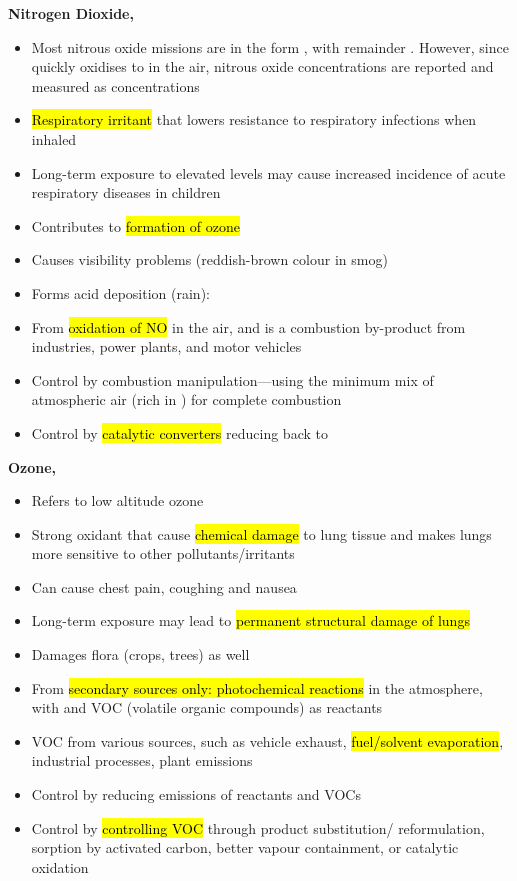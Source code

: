 \documentclass{article}
\newcommand{\headingsmall}[1]{{\small\textbf{#1}}}
\begin{document}
\begin{multicols*}{4}
\headingsmall{Nitrogen Dioxide, }
\begin{itemize} \itemsep -0.5em
    \item Most nitrous oxide missions are in the form , with remainder
        . However, since  quickly oxidises to  in
        the air, nitrous oxide concentrations are reported and measured as
         concentrations
    \item \hl{Respiratory irritant} that lowers resistance to respiratory
        infections when inhaled
    \item Long-term exposure to elevated levels may cause increased
        incidence of acute respiratory diseases in children
    \item Contributes to \hl{formation of ozone}
    \item Causes visibility problems (reddish-brown colour in smog)
    \item Forms acid deposition (rain): 
    \item From \hl{oxidation of NO} in the air, and  is a combustion
        by-product from industries, power plants, and motor vehicles
    \item Control by combustion manipulation---using the minimum mix of
        atmospheric air (rich in ) for complete combustion
    \item Control by \hl{catalytic converters} reducing  back to 
\end{itemize}

\headingsmall{Ozone, }
\begin{itemize} \itemsep -0.5em
    \item Refers to low altitude ozone
    \item Strong oxidant that cause \hl{chemical damage} to lung tissue
        and makes lungs more sensitive to other pollutants/irritants
    \item Can cause chest pain, coughing and nausea
    \item Long-term exposure may lead to \hl{permanent structural damage of lungs}
    \item Damages flora (crops, trees) as well
    \item From \hl{secondary sources only: photochemical reactions} in the atmosphere,
        with  and VOC (volatile organic compounds) as reactants
    \item VOC from various sources, such as vehicle exhaust, \hl{fuel/solvent
        evaporation}, industrial processes, plant emissions
    \item Control by reducing emissions of reactants  and VOCs
    \item Control by \hl{controlling VOC} through product substitution/
        reformulation, sorption by activated carbon, better vapour containment, or
        catalytic oxidation
\end{itemize}


\end{multicols*}
\end{document}
